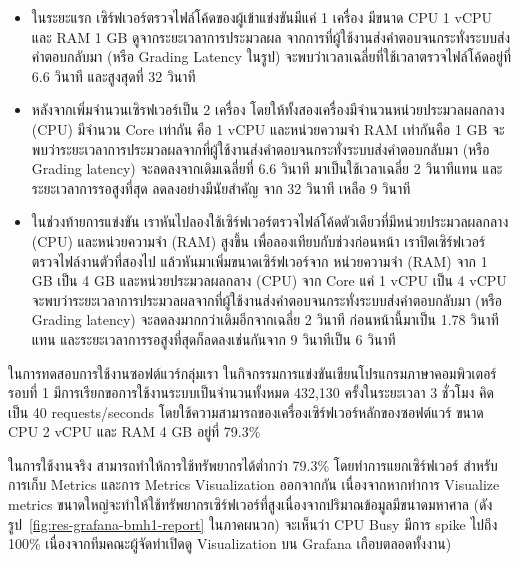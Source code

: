 \documentclass[12pt,one side,openright,a4paper]{cpe-thesis-th}
\newcommand{\thaijustify}[1]{%
  \par\hspace{30pt}\justifying
  #1
}
\begin{document}
\begin{itemize}
  \item ในระยะแรก เซิร์ฟเวอร์ตรวจไฟล์โค้ดของผู้เข้าแข่งขันมีแค่ 1 เครื่อง มีขนาด CPU 1 vCPU และ RAM 1 GB ดูจากระยะเวลาการประมวลผล จากการที่ผู้ใช้งานส่งคำตอบจนกระทั่งระบบส่งคำตอบกลับมา (หรือ Grading Latency ในรูป) จะพบว่าเวลาเฉลี่ยที่ใช้เวลาตรวจไฟล์โค้ดอยู่ที่ 6.6 วินาที และสูงสุดที่ 32 วินาที
  \item หลังจากเพิ่มจำนวนเซิรฟเวอร์เป็น 2 เครื่อง โดยให้ทั้งสองเครื่องมีจำนวนหน่วยประมวลผลกลาง (CPU) มีจำนวน Core เท่ากัน คือ 1 vCPU และหน่วยความจำ RAM เท่ากันคือ 1 GB จะพบว่าระยะเวลาการประมวลผลจากที่ผู้ใช้งานส่งคำตอบจนกระทั่งระบบส่งคำตอบกลับมา (หรือ Grading latency) จะลดลงจากเดิมเฉลี่ยที่ 6.6 วินาที มาเป็นใช้เวลาเฉลี่ย 2 วินาทีแทน และระยะเวลาการรอสูงที่สุด ลดลงอย่างมีนัยสำคัญ จาก 32 วินาที เหลือ 9 วินาที
  \item ในช่วงท้ายการแข่งขัน เราหันไปลองใช้เซิร์ฟเวอร์ตรวจไฟล์โค้ดตัวเดียวที่มีหน่วยประมวลผลกลาง (CPU) และหน่วยความจำ (RAM) สูงขึ้น เพื่อลองเทียบกับช่วงก่อนหน้า เราปิดเซิร์ฟเวอร์ตรวจไฟล์งานตัวที่สองไป แล้วหันมาเพิ่มขนาดเซิร์ฟเวอร์จาก หน่วยความจำ (RAM) จาก 1 GB เป็น 4 GB และหน่วยประมวลผลกลาง (CPU) จาก Core แค่ 1 vCPU เป็น 4 vCPU จะพบว่าระยะเวลาการประมวลผลจากที่ผู้ใช้งานส่งคำตอบจนกระทั่งระบบส่งคำตอบกลับมา (หรือ Grading latency) จะลดลงมากกว่าเดิมอีกจากเฉลี่ย 2 วินาที ก่อนหน้านี้มาเป็น 1.78 วินาทีแทน และระยะเวลาการรอสูงที่สุดก็ลดลงเช่นกันจาก 9 วินาทีเป็น 6 วินาที
\end{itemize}
\thaijustify{
  ในการทดสอบการใช้งานซอฟต์แวร์กลุ่มเรา ในกิจกรรมการแข่งขันเขียนโปรแกรมภาษาคอมพิวเตอร์รอบที่ 1 มีการเรียกขอการใช้งานระบบเป็นจำนวนทั้งหมด 432,130 ครั้งในระยะเวลา 3 ชั่วโมง คิดเป็น 40 requests/seconds โดยใช้ความสามารถของเครื่องเซิร์ฟเวอร์หลักของซอฟต์แวร์ ขนาด CPU 2 vCPU และ RAM 4 GB อยู่ที่ 79.3\%
}
\thaijustify{
  ในการใช้งานจริง สามารถทำให้การใช้ทรัพยากรได้ต่ำกว่า 79.3\% โดยทำการแยกเซิร์ฟเวอร์ สำหรับการเก็บ Metrics และการ Metrics Visualization ออกจากกัน เนื่องจากหากทำการ Visualize metrics ขนาดใหญ่จะทำให้ใช้ทรัพยากรเซิร์ฟเวอร์ที่สูงเนื่องจากปริมาณข้อมูลมีขนาดมหาศาล (ดังรูป~\ref{fig:res-grafana-bmh1-report} ในภาคผนวก) จะเห็นว่า CPU Busy มีการ spike ไปถึง 100\% เนื่องจากทีมคณะผู้จัดทำเปิดดู Visualization บน Grafana เกือบตลอดทั้งงาน)
}
\end{document}
